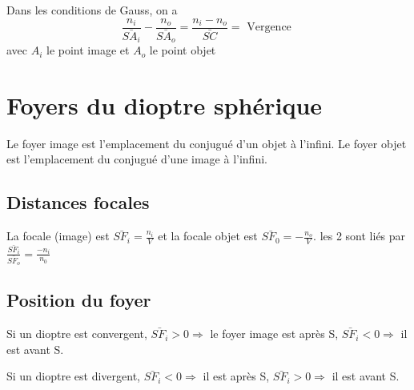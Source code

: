 \documentclass[french]{yLectureNote}
\begin{document}
\begin{theorem}
 Dans les conditions de Gauss, on a \[ \frac{n_i}{\bar{SA_i}} - \frac{n_o}{\bar{SA_o}} = \frac{n_i-n_o}{\bar{SC}} = \text{ Vergence }\] avec \(A_i\) le point image et \(A_o\) le point objet
\end{theorem}
\section{Foyers du dioptre sphérique}
\begin{definition}
Le foyer image est l'emplacement du conjugué d'un objet à l'infini. Le foyer objet est l'emplacement du conjugué d'une image à l'infini.
\end{definition}
%
\subsection{Distances focales}
\begin{definition}
La focale (image) est \(\bar{SF_i} = \frac{n_i}{V}\) et la focale objet est  \(\bar{SF_0} =- \frac{n_o}{V}\). les 2 sont liés par \(\frac{\bar{SF_i}}{\bar{SF_o}} = \frac{-n_i}{n_0}\)
\end{definition}
%
%
\subsection{Position du foyer}
Si un dioptre est convergent, \(\bar{SF_i} > 0 \Rightarrow\) le foyer image est après S,  \(\bar{SF_i} < 0 \Rightarrow\) il est avant S.

Si un dioptre est divergent, \(\bar{SF_i} < 0 \Rightarrow\) il est après S,  \(\bar{SF_i} > 0 \Rightarrow\) il est avant S.
\end{document}
